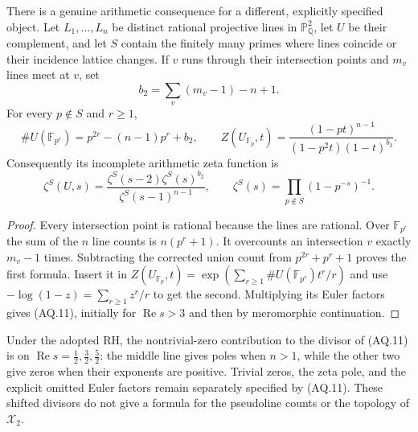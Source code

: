 There is a genuine arithmetic consequence for a
different, explicitly specified object.
Let $L_1,\dots,L_n$ be distinct rational projective
lines in $\mathbb P^2_{\mathbb Q}$, let $U$ be their
complement, and let $S$ contain the finitely many
primes where lines coincide or their incidence
lattice changes. If $v$ runs through their
intersection points and $m_v$ lines meet at $v$, set
\[
 b_2=\sum_v(m_v-1)-n+1.
\]
For every $p\notin S$ and $r\geq1$,
\[
 \#U(\mathbb F_{p^r})=p^{2r}-(n-1)p^r+b_2,\qquad
 Z(U_{\mathbb F_p},t)
  =\frac{(1-pt)^{n-1}}{(1-p^2t)(1-t)^{b_2}}.                  \tag{AQ.10}
\]
Consequently its incomplete arithmetic zeta function is
\[
 \zeta^S(U,s)=
 \frac{\zeta^S(s-2)\zeta^S(s)^{b_2}}
      {\zeta^S(s-1)^{n-1}},\qquad
 \zeta^S(s)=\prod_{p\notin S}(1-p^{-s})^{-1}.                 \tag{AQ.11}
\]
\begin{proof}
Every intersection point is rational because the
lines are rational. Over $\mathbb F_{p^r}$ the sum
of the $n$ line counts is $n(p^r+1)$.
It overcounts an intersection $v$ exactly $m_v-1$
times. Subtracting the corrected union count from
$p^{2r}+p^r+1$ proves the first formula.
Insert it in
$Z(U_{\mathbb F_p},t)=
\exp(\sum_{r\geq1}\#U(\mathbb F_{p^r})t^r/r)$
and use $-\log(1-z)=\sum_{r\geq1}z^r/r$ to get
the second. Multiplying its Euler factors gives
(AQ.11), initially for $\operatorname{Re}s>3$
and then by meromorphic continuation.
\end{proof}
Under the adopted RH, the nontrivial-zero contribution
to the divisor of (AQ.11) is on
$\operatorname{Re}s=\tfrac12,\tfrac32,\tfrac52$:
the middle line gives poles when $n>1$, while the
other two give zeros when their exponents are
positive. Trivial zeros, the zeta pole, and the
explicit omitted Euler factors remain separately
specified by (AQ.11). These shifted divisors do not
give a formula for the pseudoline counts or the
topology of $\mathcal X_2$.

